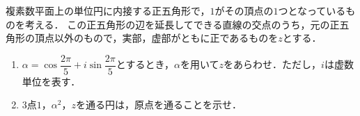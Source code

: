 複素数平面上の単位円に内接する正五角形で，$1$がその頂点の$1$つとなっているものを考える．
この正五角形の辺を延長してできる直線の交点のうち，元の正五角形の頂点以外のもので，実部，虚部がともに正であるものを$z$とする．
\begin{enumerate}
  \item $\alpha=\cos\dfrac{2\pi}{5}+i\sin\dfrac{2\pi}{5}$とするとき，$\alpha$を用いて$z$をあらわせ．ただし，$i$は虚数単位を表す．
  \item $3$点$1$，$\alpha^2$，$z$を通る円は，原点を通ることを示せ．
\end{enumerate}